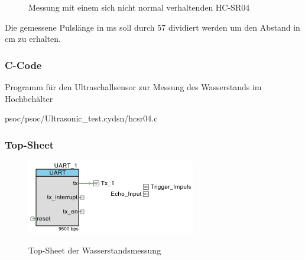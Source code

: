 \documentclass[12pt,a4paper,german]{article}
\begin{document}
	\begin{figure}[H]
		
		\centering
		\label{fig:hc-sr04_broken}

		\caption{Messung mit einem sich nicht normal verhaltenden 
			HC-SR04}
	\end{figure}

	Die gemessene Pulslänge in ms soll durch 57 dividiert werden um den
	Abstand in cm zu erhalten.
	
\subsubsection{C-Code}
	
	Programm für den Ultraschallsensor zur Messung des Wasserstands im 
	Hochbehälter

	
	{psoc/psoc/Ultrasonic_test.cydsn/hcsr04.c}
\subsubsection{Top-Sheet}
	 
	\begin{figure}[H]
		\centering
		\includegraphics[width=\textwidth]{pictures/topsch_ultrasonic.png}
		\label{fig:topsch_ultrasonic}
		\caption{Top-Sheet der Wasserstandsmessung}
	\end{figure}
\end{document}
